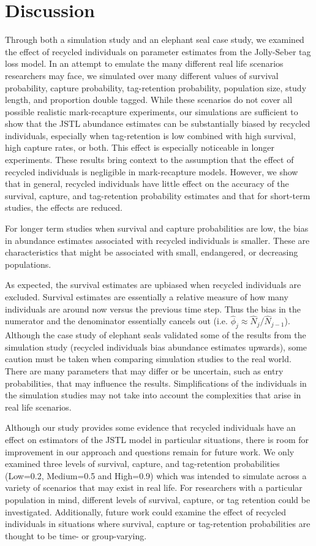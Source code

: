 \documentclass[12pt]{article}
\begin{document}
\section{Discussion}\label{discussion}
Through both a simulation study and an elephant seal case study, we examined the effect of recycled individuals on parameter estimates from the Jolly-Seber tag loss model. In an attempt to emulate the many different real life scenarios researchers may face, we simulated over many different values of survival probability, capture probability, tag-retention probability, population size, study length, and proportion double tagged. While these scenarios do not cover all possible realistic mark-recapture experiments, our simulations are sufficient to show that the JSTL abundance estimates can be substantially biased by recycled individuals, especially when tag-retention is low combined with high survival, high capture rates, or both. This effect is especially noticeable in longer experiments. These results bring context to the assumption that the effect of recycled individuals is negligible in mark-recapture models. However, we show that in general, recycled individuals have little effect on the accuracy of the survival, capture, and tag-retention probability
estimates and that for short-term studies, the effects are reduced.

For longer term studies when survival and capture probabilities are low, the bias in abundance estimates associated with recycled individuals is smaller.  These are characteristics that might be associated with small, endangered, or decreasing populations. 

As expected, the survival estimates are upbiased when recycled individuals are excluded.  Survival estimates are essentially a relative measure of how many individuals are around now versus the previous time step.  Thus the bias in the numerator and the denominator essentially cancels out (i.e. $\hat{\phi}_j \approx \hat{N}_{j}/\hat{N}_{j-1}$).	
Although the case study of elephant seals validated some of the results from
the simulation study (recycled individuals bias abundance estimates
upwards), some caution must be taken when comparing simulation studies
to the real world. There are many parameters that may differ or be
uncertain, such as entry probabilities, that may influence the results.
Simplifications of the individuals in the simulation studies may not
take into account the complexities that arise in real life
scenarios.

Although our study provides some evidence that recycled individuals have
an effect on estimators of the JSTL model in particular situations,
there is room for improvement in our approach and questions remain for
future work. We only examined three levels of survival, capture, and
tag-retention probabilities (Low=0.2, Medium=0.5 and High=0.9) which was
intended to simulate across a variety of scenarios that may exist
in real life. For researchers with a particular population in mind, different levels of survival, capture, or tag retention could be investigated. Additionally, future work could examine the effect of
recycled individuals in situations where survival, capture or
tag-retention probabilities are thought to be time- or group-varying.
\end{document}
